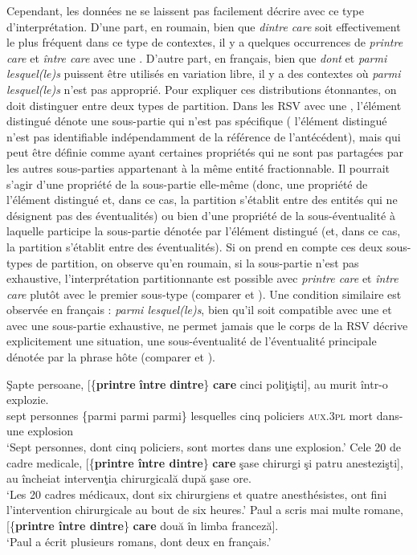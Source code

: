 Cependant, les données ne se laissent pas facilement décrire avec ce type d’interprétation. D’une part, en roumain, bien que \textit{dintre care} soit effectivement le plus fréquent dans ce type de contextes, il y a quelques occurrences de \textit{printre care} et \textit{între care} avec une . D’autre part, en français, bien que \textit{dont} et \textit{parmi lesquel(le)s} puissent être utilisés en variation libre, il y a des contextes où \textit{parmi lesquel(le)s} n’est pas approprié. Pour expliquer ces distributions étonnantes, on doit distinguer entre deux types de partition. Dans les RSV avec une , l’élément distingué dénote une sous-partie qui n’est pas spécifique ({\cad} l’élément distingué n’est pas identifiable indépendamment de la référence de l’antécédent), mais qui peut être définie comme ayant certaines propriétés qui ne sont pas partagées par les autres sous-parties appartenant à la même entité fractionnable. Il pourrait s’agir d’une propriété de la sous-partie elle-même (donc, une propriété de l’élément distingué et, dans ce cas, la partition s’établit entre des entités qui ne désignent pas des éventualités) ou bien d’une propriété de la sous-éventualité à laquelle participe la sous-partie dénotée par l’élément distingué (et, dans ce cas, la partition s’établit entre des éventualités). Si on prend en compte ces deux sous-types de partition, on observe qu’en roumain, si la sous-partie n’est pas exhaustive, l’interprétation partitionnante est possible avec \textit{printre care} et \textit{între care} plutôt avec le premier sous-type (comparer  et ). Une condition similaire est observée en français : \textit{parmi lesquel(le)s}, bien qu’il soit compatible avec une  et avec une sous-partie exhaustive, ne permet jamais que le corps de la RSV décrive explicitement une situation, {\cad} une sous-éventualité de l’éventualité principale dénotée par la phrase hôte (comparer  et ).

\ea \label{ch3:ex66} 
\ea
\gll Şapte  persoane,  [\{\textbf{printre}  {\textbar}  \textbf{între}  {\textbar} \textbf{dintre}\}  \textbf{care}  cinci  poliţişti], au murit  într-o  explozie.\\
sept  personnes  \{parmi  {\textbar}  parmi  {\textbar}  parmi\}  lesquelles  cinq  policiers  \textsc{aux.3pl} mort  dans-une  explosion \\
\glt ‘Sept personnes, dont cinq policiers, sont mortes dans une explosion.’
\ex 
Cele 20 de cadre medicale, [\{\textbf{printre {\textbar} între {\textbar} dintre}\} \textbf{care} şase chirurgi şi patru anestezişti], au încheiat intervenţia chirurgicală după şase ore.\\
\glt ‘Les 20 cadres médicaux, dont six chirurgiens et quatre anesthésistes, ont fini l’intervention chirurgicale au bout de six heures.’
\ex 
Paul a scris mai multe romane, [\{\textbf{printre {\textbar} între {\textbar} dintre}\} \textbf{care} două în limba franceză].\\
\glt ‘Paul a écrit plusieurs romans, dont deux en français.’
\z 
\z


